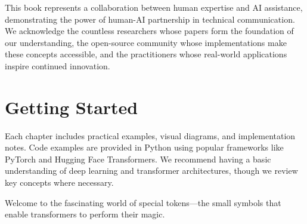 This book represents a collaboration between human expertise and AI assistance, demonstrating the power of human-AI partnership in technical communication. We acknowledge the countless researchers whose papers form the foundation of our understanding, the open-source community whose implementations make these concepts accessible, and the practitioners whose real-world applications inspire continued innovation.

\section*{Getting Started}

Each chapter includes practical examples, visual diagrams, and implementation notes. Code examples are provided in Python using popular frameworks like PyTorch and Hugging Face Transformers. We recommend having a basic understanding of deep learning and transformer architectures, though we review key concepts where necessary.

Welcome to the fascinating world of special tokens---the small symbols that enable transformers to perform their magic.
\begin{comment}
Feedback: The final sentence is a bit generic. A more specific and exciting closing could be: "Welcome to the world of special tokens—the small but mighty components that unlock the true potential of the transformer architecture."
\end{comment}